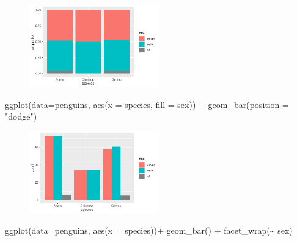 \documentclass[
  letterpaper,
  DIV=11,
  numbers=noendperiod]{scrreprt}
\newenvironment{Shaded}{\begin{snugshade}}{\end{snugshade}}
\newcommand{\AttributeTok}[1]{\textcolor[rgb]{0.40,0.45,0.13}{#1}}
\newcommand{\FunctionTok}[1]{\textcolor[rgb]{0.28,0.35,0.67}{#1}}
\newcommand{\NormalTok}[1]{\textcolor[rgb]{0.00,0.23,0.31}{#1}}
\newcommand{\SpecialCharTok}[1]{\textcolor[rgb]{0.37,0.37,0.37}{#1}}
\newcommand{\StringTok}[1]{\textcolor[rgb]{0.13,0.47,0.30}{#1}}
\begin{document}
\begin{tcolorbox}[enhanced jigsaw, colframe=quarto-callout-note-color-frame, breakable, colback=white, toprule=.15mm, leftrule=.75mm, left=2mm, opacityback=0, rightrule=.15mm, arc=.35mm, bottomrule=.15mm]
\begin{figure}[H]
{\centering \includegraphics[width=0.5\textwidth,height=\textheight]{05-content_files/figure-pdf/proportion-barplot-1.pdf}

}

\end{figure}

\begin{Shaded}
\begin{Highlighting}[]
\FunctionTok{ggplot}\NormalTok{(}\AttributeTok{data=}\NormalTok{penguins, }\FunctionTok{aes}\NormalTok{(}\AttributeTok{x =}\NormalTok{ species, }\AttributeTok{fill =}\NormalTok{ sex)) }\SpecialCharTok{+}
  \FunctionTok{geom\_bar}\NormalTok{(}\AttributeTok{position =} \StringTok{"dodge"}\NormalTok{)}
\end{Highlighting}
\end{Shaded}

\begin{figure}[H]

{\centering \includegraphics[width=0.5\textwidth,height=\textheight]{05-content_files/figure-pdf/side-by-side-barplot-1.pdf}

}

\end{figure}

\begin{Shaded}
\begin{Highlighting}[]
\FunctionTok{ggplot}\NormalTok{(}\AttributeTok{data=}\NormalTok{penguins, }\FunctionTok{aes}\NormalTok{(}\AttributeTok{x =}\NormalTok{ species))}\SpecialCharTok{+}
  \FunctionTok{geom\_bar}\NormalTok{() }\SpecialCharTok{+}
  \FunctionTok{facet\_wrap}\NormalTok{(}\SpecialCharTok{\textasciitilde{}}\NormalTok{ sex)}
\end{Highlighting}
\end{Shaded}


\end{tcolorbox}
\end{document}
